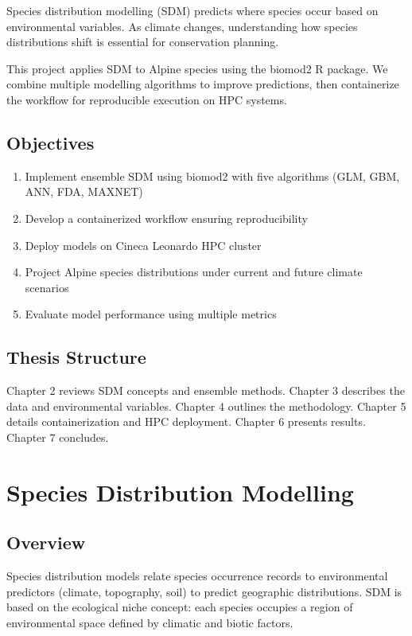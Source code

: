 \documentclass[12pt,a4paper]{report}
\begin{document}
Species distribution modelling (SDM) predicts where species occur based on environmental variables. As climate changes, understanding how species distributions shift is essential for conservation planning.

This project applies SDM to Alpine species using the biomod2 R package. We combine multiple modelling algorithms to improve predictions, then containerize the workflow for reproducible execution on HPC systems.

\section{Objectives}

\begin{enumerate}
    \item Implement ensemble SDM using biomod2 with five algorithms (GLM, GBM, ANN, FDA, MAXNET)
    \item Develop a containerized workflow ensuring reproducibility
    \item Deploy models on Cineca Leonardo HPC cluster
    \item Project Alpine species distributions under current and future climate scenarios
    \item Evaluate model performance using multiple metrics
\end{enumerate}

\section{Thesis Structure}

Chapter 2 reviews SDM concepts and ensemble methods. Chapter 3 describes the data and environmental variables. Chapter 4 outlines the methodology. Chapter 5 details containerization and HPC deployment. Chapter 6 presents results. Chapter 7 concludes.

\chapter{Species Distribution Modelling}

\section{Overview}

Species distribution models relate species occurrence records to environmental predictors (climate, topography, soil) to predict geographic distributions. SDM is based on the ecological niche concept: each species occupies a region of environmental space defined by climatic and biotic factors.
\end{document}
